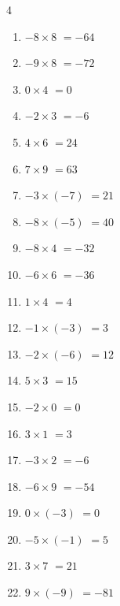 \begin{multicols}{4}
\begin{enumerate}
  \item $-8\times 8$
        $=-64$

  \item $-9\times 8$
        $=-72$

  \item $0\times 4$
        $=0$

  \item $-2\times 3$
        $=-6$

  \item $4\times 6$
        $=24$

  \item $7\times 9$
        $=63$

  \item $-3\times (-7)$
        $=21$

  \item $-8\times (-5)$
        $=40$

  \item $-8\times 4$
        $=-32$

  \item $-6\times 6$
        $=-36$

  \item $1\times 4$
        $=4$

  \item $-1\times (-3)$
        $=3$

  \item $-2\times (-6)$
        $=12$

\columnbreak %

  \item $5\times 3$
        $=15$

  \item $-2\times 0$
        $=0$

  \item $3\times 1$
        $=3$

  \item $-3\times 2$
        $=-6$

  \item $-6\times 9$
        $=-54$

  \item $0\times (-3)$
        $=0$

  \item $-5\times (-1)$
        $=5$

  \item $3\times 7$
        $=21$

  \item $9\times (-9)$
        $=-81$


\end{enumerate}
\end{multicols}
